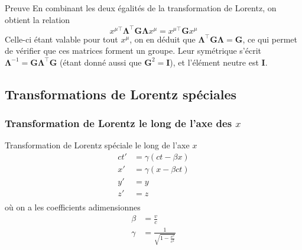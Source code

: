     \begin{demo}{Preuve}
        En combinant les deux égalités de la transformation de Lorentz, on obtient la relation 
        \[ x^{\mu\top} \symbf{\Lambda}^{\top} \mathbf{G} \symbf{\Lambda} x^{\mu} =  x^{\mu\top} \mathbf{G} x^{\mu} \]
        Celle-ci étant valable pour tout $x^{\mu}$, on en déduit que $ \symbf{\Lambda}^{\top} \mathbf{G}  \symbf{\Lambda} = \mathbf{G}$, ce qui permet de vérifier que ces matrices forment un groupe. Leur symétrique s’écrit $\symbf{\Lambda}^{-1} = \mathbf{G} \symbf{\Lambda}^{\top} \mathbf{G}$ (étant donné aussi que $\mathbf{G}^2 = \mathbf{I}$), et l’élément neutre est $\mathbf{I}$.
    \end{demo}

    \subsection{Transformations de Lorentz spéciales}

        \subsubsection{Transformation de Lorentz le long de l’axe des $x$}

        \begin{omed}{Transformation de Lorentz spéciale le long de l’axe $x$}
            \begin{align*}
                ct' &= \gamma(ct - \beta x) \\
                x' &= \gamma(x - \beta ct) \\
                y' &= y \\
                z' &= z \\
            \end{align*}
            où on a les coefficients adimensionnes
            \begin{align*}
                \beta &= \frac{v}{c} \\
                \gamma &= \frac{1}{\sqrt{1 - \frac{v^2}{c^2}}}
            \end{align*}
        \end{omed}

